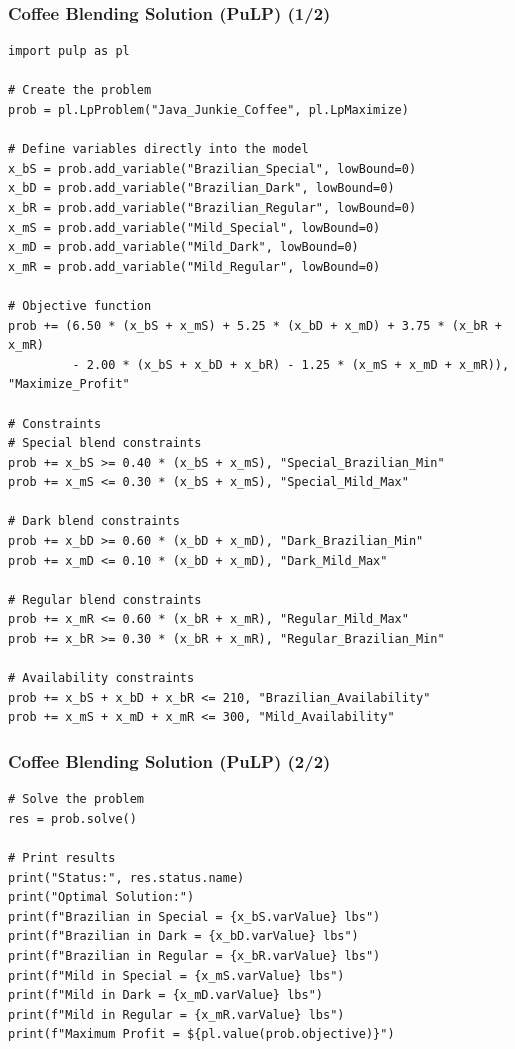 \documentclass{beamer}
\begin{document}
\begin{frame}
\frametitle{Coffee Blending Solution (PuLP) (1/2)}
\begin{lstlisting}
import pulp as pl

# Create the problem
prob = pl.LpProblem("Java_Junkie_Coffee", pl.LpMaximize)

# Define variables directly into the model
x_bS = prob.add_variable("Brazilian_Special", lowBound=0)
x_bD = prob.add_variable("Brazilian_Dark", lowBound=0)
x_bR = prob.add_variable("Brazilian_Regular", lowBound=0)
x_mS = prob.add_variable("Mild_Special", lowBound=0)
x_mD = prob.add_variable("Mild_Dark", lowBound=0)
x_mR = prob.add_variable("Mild_Regular", lowBound=0)

# Objective function
prob += (6.50 * (x_bS + x_mS) + 5.25 * (x_bD + x_mD) + 3.75 * (x_bR + x_mR) 
         - 2.00 * (x_bS + x_bD + x_bR) - 1.25 * (x_mS + x_mD + x_mR)), "Maximize_Profit"

# Constraints
# Special blend constraints
prob += x_bS >= 0.40 * (x_bS + x_mS), "Special_Brazilian_Min"
prob += x_mS <= 0.30 * (x_bS + x_mS), "Special_Mild_Max"

# Dark blend constraints
prob += x_bD >= 0.60 * (x_bD + x_mD), "Dark_Brazilian_Min"
prob += x_mD <= 0.10 * (x_bD + x_mD), "Dark_Mild_Max"

# Regular blend constraints
prob += x_mR <= 0.60 * (x_bR + x_mR), "Regular_Mild_Max"
prob += x_bR >= 0.30 * (x_bR + x_mR), "Regular_Brazilian_Min"

# Availability constraints
prob += x_bS + x_bD + x_bR <= 210, "Brazilian_Availability"
prob += x_mS + x_mD + x_mR <= 300, "Mild_Availability"

\end{lstlisting}
\end{frame}

\begin{frame}
\frametitle{Coffee Blending Solution (PuLP) (2/2)}
\begin{lstlisting}
# Solve the problem
res = prob.solve()

# Print results
print("Status:", res.status.name)
print("Optimal Solution:")
print(f"Brazilian in Special = {x_bS.varValue} lbs")
print(f"Brazilian in Dark = {x_bD.varValue} lbs")
print(f"Brazilian in Regular = {x_bR.varValue} lbs")
print(f"Mild in Special = {x_mS.varValue} lbs")
print(f"Mild in Dark = {x_mD.varValue} lbs")
print(f"Mild in Regular = {x_mR.varValue} lbs")
print(f"Maximum Profit = ${pl.value(prob.objective)}")
\end{lstlisting}
\end{frame}
\end{document}
